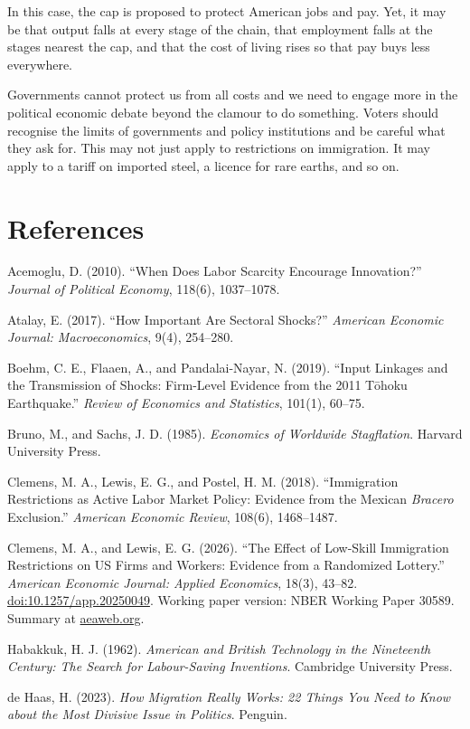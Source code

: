 \documentclass[11pt,a4paper]{article}
\begin{document}
In this case, the cap is proposed to protect American jobs and pay. Yet, it may be that output falls at every stage of the chain, that employment falls at the stages nearest the cap, and that the cost of living rises so that pay buys less everywhere.

Governments cannot protect us from all costs and we need to engage more in the political economic debate beyond the clamour to do something. Voters should recognise the limits of governments and policy institutions and be careful what they ask for.  This may not just apply to restrictions on immigration. It may apply to a tariff on imported steel, a licence for rare earths, and so on.

\section*{References}
Acemoglu, D. (2010). ``When Does Labor Scarcity Encourage Innovation?'' \emph{Journal of Political Economy}, 118(6), 1037--1078.

Atalay, E. (2017). ``How Important Are Sectoral Shocks?'' \emph{American Economic Journal: Macroeconomics}, 9(4), 254--280.

Boehm, C. E., Flaaen, A., and Pandalai-Nayar, N. (2019). ``Input Linkages and the Transmission of Shocks: Firm-Level Evidence from the 2011 T\=ohoku Earthquake.'' \emph{Review of Economics and Statistics}, 101(1), 60--75.

Bruno, M., and Sachs, J. D. (1985). \emph{Economics of Worldwide Stagflation}. Harvard University Press.

Clemens, M. A., Lewis, E. G., and Postel, H. M. (2018). ``Immigration Restrictions as Active Labor Market Policy: Evidence from the Mexican \emph{Bracero} Exclusion.'' \emph{American Economic Review}, 108(6), 1468--1487.

Clemens, M. A., and Lewis, E. G. (2026). ``The Effect of Low-Skill Immigration Restrictions on US Firms and Workers: Evidence from a Randomized Lottery.'' \emph{American Economic Journal: Applied Economics}, 18(3), 43--82. \href{https://doi.org/10.1257/app.20250049}{doi:10.1257/app.20250049}. Working paper version: NBER Working Paper 30589. Summary at \href{https://www.aeaweb.org/research/immigration-restrictions-firms-workers}{aeaweb.org}.

Habakkuk, H. J. (1962). \emph{American and British Technology in the Nineteenth Century: The Search for Labour-Saving Inventions}. Cambridge University Press.

de Haas, H. (2023). \emph{How Migration Really Works: 22 Things You Need to Know about the Most Divisive Issue in Politics}. Penguin.
\end{document}
